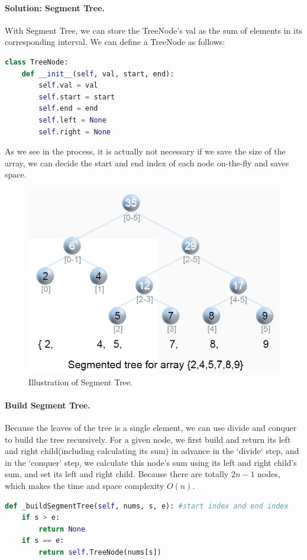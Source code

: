 \documentclass[../main.tex]{subfiles}
\begin{document}
\begin{examples}[resume]
\paragraph{Solution: Segment Tree.}  With Segment Tree, we can store the TreeNode's val as the sum of elements in its corresponding interval. We can define a TreeNode as follows:
\begin{lstlisting}[language=Python]
class TreeNode:
    def __init__(self, val, start, end):
        self.val = val
        self.start = start
        self.end = end
        self.left = None
        self.right = None
\end{lstlisting}
As we see in the process, it is actually not necessary if we save the size of the array, we can decide the start and end index of each node on-the-fly and saves space. 
\begin{figure}[h]
    \centering
    \includegraphics[width=0.8\columnwidth]{fig/307_RSQ_SegmentTree.png}
    \caption{Illustration of Segment Tree. }
    \label{fig:segment_tree}
\end{figure}
\paragraph{Build Segment Tree.} Because the leaves of the tree is a single element, we can use divide and conquer to build the tree recursively.  For a given node, we first build and return its left and right child(including calculating its sum) in advance in the `divide` step, and in the `conquer' step, we calculate this node's sum using its left and right child's sum, and set its left and right child. Because there are totally $2n-1$ nodes, which makes the time and space complexity $O(n)$.
\begin{lstlisting}[language=Python]
def _buildSegmentTree(self, nums, s, e): #start index and end index
    if s > e:
        return None
    if s == e:
        return self.TreeNode(nums[s])
    

\end{lstlisting}
\end{examples}
\end{document}
